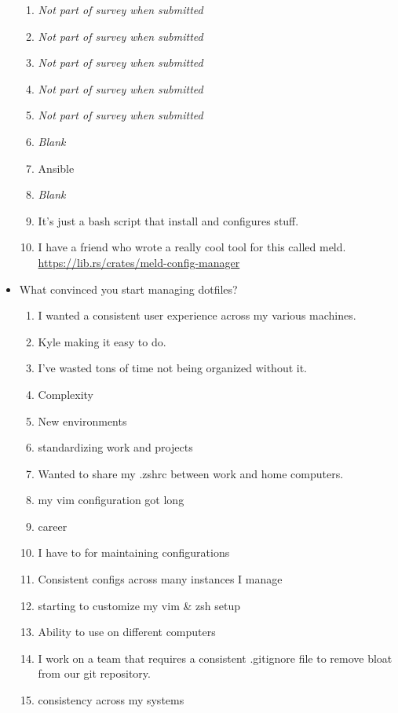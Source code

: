 \documentclass[letterpaper]{jdf}
\begin{document}
\begin{itemize}
\begin{enumerate}
        \item \emph{Not part of survey when submitted}
        \item \emph{Not part of survey when submitted}
        \item \emph{Not part of survey when submitted}
        \item \emph{Not part of survey when submitted}
        \item \emph{Not part of survey when submitted}
        \item \emph{Blank}
        \item Ansible
        \item \emph{Blank}
        \item It's just a bash script that install and configures stuff.
        \item I have a friend who wrote a really cool tool for this called meld. \href{https://lib.rs/crates/meld-config-manager}{https://lib.rs/crates/meld-config-manager}
    \end{enumerate}
    \item What convinced you start managing dotfiles?
    \begin{enumerate}
        \item I wanted a consistent user experience across my various machines.
        \item Kyle making it easy to do.
        \item I've wasted tons of time not being organized without it.
        \item Complexity
        \item New environments
        \item standardizing work and projects
        \item Wanted to share my .zshrc between work and home computers.
        \item my vim configuration got long
        \item career
        \item I have to for maintaining configurations
        \item Consistent configs across many instances I manage
        \item starting to customize my vim \& zsh setup
        \item Ability to use on different computers
        \item I work on a team that requires a consistent .gitignore file to remove bloat from our git repository.
        \item consistency across my systems

\end{enumerate}
\end{itemize}
\end{document}
